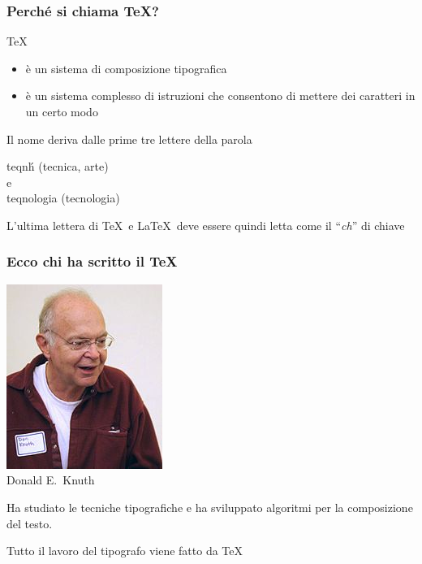 \documentclass[10pt,svgnames,%
ucs,%
pdftex]{mybeamer}
\begin{document}
\begin{frame}
	\frametitle{Perch\'e si chiama \TeX?}
	\begin{block}{\TeX}
		\begin{itemize}
			\item è un sistema di composizione tipografica
			\item è un sistema complesso di istruzioni che consentono di mettere dei caratteri in un certo modo
		\end{itemize}
	\end{block}
	\bigskip
	
	Il nome deriva dalle prime tre lettere della parola\\[.5cm]
	\begin{center}
		\alert{\large\foreignlanguage{greek}{teqn\'h}}
		(tecnica, arte)\\
		e\\
		\alert{\large\foreignlanguage{greek}{teqnologia}}
		(tecnologia)
	\end{center} 
	\bigskip
	\begin{center}
		L'ultima lettera di \TeX\ e \LaTeX\ deve essere quindi letta
		come il ``\emph{ch}'' di chiave
	\end{center}
\end{frame}
\begin{frame}
	\frametitle{Ecco chi ha scritto il \TeX}
	\begin{center}
		\includegraphics[scale=.5]{img/knuth}\\[.5em]
		\large Donald E.\ Knuth
	\end{center}
	Ha studiato le tecniche tipografiche e ha sviluppato algoritmi per la composizione del testo.	
	\begin{block}{}
		\begin{center}
			Tutto il lavoro del tipografo viene fatto da \TeX
		\end{center}
	\end{block}
\end{frame}
\end{document}
